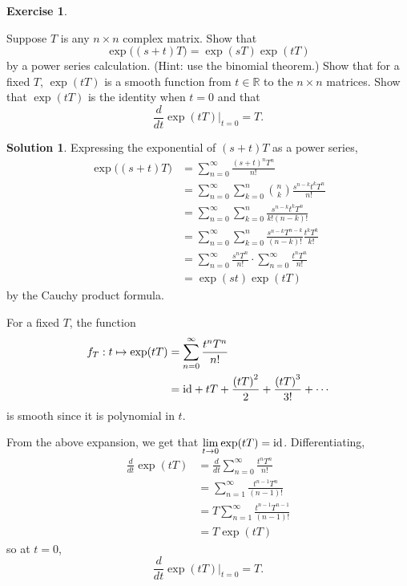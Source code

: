 \documentclass[11pt, a4paper]{report}
\theoremstyle{definition}
\newtheorem{exercise}{Exercise}[part]
\newtheorem{solution}{Solution}[part]
\newenvironment{ex}{\begin{exercise}}{\end{exercise}\pagebreak[1]}
\newenvironment{sol}{\begin{solution}}{\end{solution}\pagebreak[3]}
\newcommand*{\id}{\ensuremath\mathop{}\mathopen{}\mathrm{id}}
\begin{document}
\begin{ex}\label{ex:exptTidentities}

Suppose $T$ is any $n \times n$ complex matrix. Show that
\[
    \exp\bigl( (s + t) T \bigr) = \exp(sT) \exp(tT)
\]
by a power series calculation. (Hint: use the binomial theorem.)
Show that for a fixed $T$, $\exp(tT)$ is a smooth function from $t \in \mathbb{R}$ to the $n \times n$ matrices.
Show that $\exp(tT)$ is the identity when $t = 0$ and that
\[
    \frac{d}{dt} \exp(tT) \Big|_{t = 0} = T.
\]

\end{ex}

\begin{sol}

Expressing the exponential of $(s + t)T$ as a power series,
\begin{align*}
    \exp\bigl( (s + t) T \bigr) &= \sum_{n = 0}^\infty \frac{{(s + t)}^n T^n}{n!} \\
        &= \sum_{n = 0}^\infty \sum_{k = 0}^n \binom{n}{k} \frac{s^{n - k} t^k T^n}{n!} \\
        &= \sum_{n = 0}^\infty \sum_{k = 0}^n \frac{s^{n - k} t^k T^n}{k! (n - k)!} \\
        &= \sum_{n = 0}^\infty \sum_{k = 0}^n \frac{s^{n - k} T^{n - k}}{(n - k)!} \frac{t^k T^k}{k!} \\
        &= \sum_{n = 0}^\infty \frac{s^n T^n}{n!} \cdot \sum_{n = 0}^\infty \frac{t^n T^n}{n!} \\
        &= \exp(st) \exp(tT)
\end{align*}
by the Cauchy product formula.

For a fixed $T$, the function
\begin{align*}
    f_T: t \mapsto \exp(tT) &= \sum_{n = 0}^\infty \frac{{t^n}T^n}{n!} \\
        &= \id + tT + \frac{{(tT)}^2}{2} + \frac{{(tT)}^3}{3!} + \cdots
\end{align*}
is smooth since it is polynomial in $t$.

From the above expansion, we get that $\displaystyle \lim_{t \to 0} \exp(tT) = \id$.
Differentiating,
\begin{align*}
    \frac{d}{dt} \exp(tT) &= \frac{d}{dt} \sum_{n = 0}^\infty \frac{{t^n}T^n}{n!} \\
        &= \sum_{n = 1}^\infty \frac{t^{n - 1} T^n}{(n - 1)!} \\
        &= T \sum_{n = 1}^\infty \frac{t^{n - 1} T^{n - 1}}{(n - 1)!} \\
        &= T \exp(tT)
\end{align*}
so at $t = 0$,
\[
    \frac{d}{dt} \exp(tT) \Big|_{t = 0} = T.
\]

\end{sol}
\end{document}
